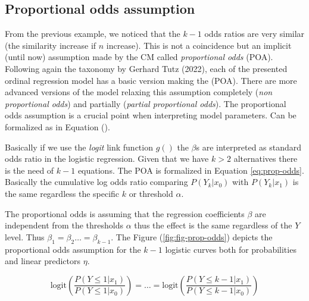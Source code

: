 \documentclass[
  man,floatsintext]{apa6}
\begin{document}
\normalsize

\subsection{Proportional odds assumption}\label{proportional-odds-assumption}

From the previous example, we noticed that the \(k - 1\) odds ratios are very similar (the similarity increase if \(n\) increase). This is not a coincidence but an implicit (until now) assumption made by the CM called \emph{proportional odds} (POA). Following again the taxonomy by Gerhard Tutz (2022), each of the presented ordinal regression model has a basic version making the (POA). There are more advanced versions of the model relaxing this assumption completely (\emph{non proportional odds}) and partially (\emph{partial proportional odds}). The proportional odds assumption is a crucial point when interpreting model parameters. Can be formalized as in Equation ().

Basically if we use the \emph{logit} link function \(g()\) the \(\beta\)s are interpreted as standard odds ratio in the logistic regression. Given that we have \(k > 2\) alternatives there is the need of \(k - 1\) equations. The POA is formalized in Equation \eqref{eq:prop-odds}. Basically the cumulative log odds ratio comparing \(P(Y_k|x_0)\) with \(P(Y_k|x_1)\) is the same regardless the specific \(k\) or threshold \(\alpha\).

The proportional odds is assuming that the regression coefficients \(\beta\) are independent from the thresholds \(\alpha\) thus the effect is the same regardless of the \(Y\) level. Thus \(\beta_1 = \beta_2 \dots = \beta_{k - 1}\). The Figure (\ref{fig:fig-prop-odds}) depicts the proportional odds assumption for the \(k - 1\) logistic curves both for probabilities and linear predictors \(\eta\).

\begin{equation}
\text{logit} (\frac{P(Y \leq 1 |x_1)}{P(Y \leq 1 |x_0)}) = \dots = \text{logit} (\frac{P(Y \leq k - 1 |x_1)}{P(Y \leq k -1 |x_0)})
\label{eq:prop-odds}
\end{equation}

\scriptsize
\end{document}
